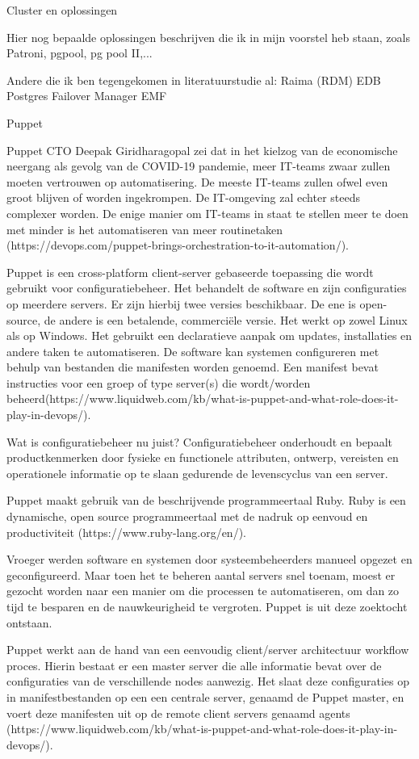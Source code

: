 
Cluster en oplossingen

Hier nog bepaalde oplossingen beschrijven die ik in mijn voorstel heb staan, zoals Patroni, pgpool, pg pool II,...

Andere die ik ben tegengekomen in literatuurstudie al:
Raima (RDM)
EDB Postgres Failover Manager EMF

Puppet

Puppet CTO Deepak Giridharagopal zei dat in het kielzog van de economische neergang als gevolg van de COVID-19 pandemie, meer IT-teams zwaar zullen moeten vertrouwen op automatisering. De meeste IT-teams zullen ofwel even groot blijven of worden ingekrompen. De IT-omgeving zal echter steeds complexer worden. De enige manier om IT-teams in staat te stellen meer te doen met minder is het automatiseren van meer routinetaken (https://devops.com/puppet-brings-orchestration-to-it-automation/).

Puppet is een cross-platform client-server gebaseerde toepassing die wordt gebruikt voor configuratiebeheer. Het behandelt de software en zijn configuraties op meerdere servers. Er zijn hierbij twee versies beschikbaar. De ene is open-source, de andere is een betalende, commerciële versie. Het werkt op zowel Linux als op Windows. Het gebruikt een declaratieve aanpak om updates, installaties en andere taken te automatiseren. De software kan systemen configureren met behulp van bestanden die manifesten worden genoemd. Een manifest bevat instructies voor een groep of type server(s) die wordt/worden beheerd(https://www.liquidweb.com/kb/what-is-puppet-and-what-role-does-it-play-in-devops/). 

Wat is configuratiebeheer nu juist? Configuratiebeheer onderhoudt en bepaalt productkenmerken door fysieke en functionele attributen, ontwerp, vereisten en operationele informatie op te slaan gedurende de levenscyclus van een server. 

Puppet maakt gebruik van de beschrijvende programmeertaal Ruby. Ruby is een dynamische, open source programmeertaal met de nadruk op eenvoud en productiviteit (https://www.ruby-lang.org/en/).

Vroeger werden software en systemen door systeembeheerders manueel opgezet en geconfigureerd. Maar toen het te beheren aantal servers snel toenam, moest er gezocht worden naar een manier om die processen te automatiseren, om dan zo tijd te besparen en de nauwkeurigheid te vergroten. Puppet is uit deze zoektocht ontstaan.

Puppet werkt aan de hand van een eenvoudig client/server architectuur workflow proces. Hierin bestaat er een master server die alle informatie bevat over de configuraties van de verschillende nodes aanwezig. Het slaat deze configuraties op in manifestbestanden op een een centrale server, genaamd de Puppet master, en voert deze manifesten uit op de remote client servers genaamd agents (https://www.liquidweb.com/kb/what-is-puppet-and-what-role-does-it-play-in-devops/).

